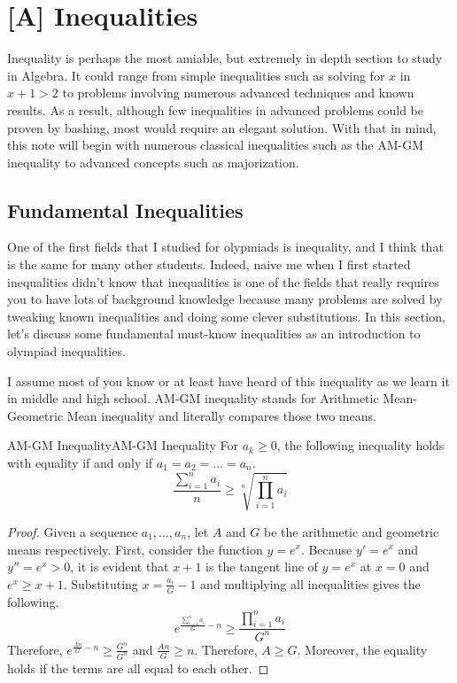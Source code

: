 \documentclass[../../../main.tex]{subfiles}
\begin{document}
\chapter{[A] Inequalities}

Inequality is perhaps the most amiable, but extremely in depth
section to study in Algebra. It could range from simple inequalities
such as solving for $x$ in $x + 1 > 2$ to problems involving
numerous advanced techniques and known results. As a result,
although few inequalities in advanced problems could be proven by
bashing, most would require an elegant solution. With that in mind,
this note will begin with numerous classical inequalities such as
the AM-GM inequality to advanced concepts such as majorization.

\section{Fundamental Inequalities}

One of the first fields that I studied for olypmiads is inequality,
and I think that is the same for many other students. Indeed,
naive me when I first started inequalities didn't know that
inequalities is one of the fields that really requires you to have
lots of background knowledge because many problems are solved
by tweaking known inequalities and doing some clever substitutions.
In this section, let's discuss some fundamental must-know inequalities
as an introduction to olympiad inequalities.

I assume most of you know or at least have heard of this inequality
as we learn it in middle and high school. AM-GM inequality stands
for Arithmetic Mean-Geometric Mean inequality and literally compares
those two means.

\begin{theorem}{AM-GM Inequality}{AM-GM Inequality}
For $a_k \geq 0$, the following inequality holds with equality if
and only if $a_1 = a_2 = \dots = a_n$.
\vspace{-0.8\baselineskip}
\[
\frac{ \sum_{i=1}^n a_i }{n} \geq
\sqrt[n]{ \prod_{i=1}^n a_i }
\]
\end{theorem}
\begin{proof}
Given a sequence $a_1, \ldots, a_n$, let $A$ and $G$ be the arithmetic
and geometric means respectively. First, consider the function
$y = e^x$. Because $y' = e^x$ and $y'' = e^x > 0$, it is evident that
$x + 1$ is the tangent line of $y = e^x$ at $x = 0$ and
$e^x \geq x + 1$. Substituting $x = \frac{a_i}{G} - 1$ and multiplying
all inequalities gives the following.
\[
e^{ \frac{\sum_{i=1}^n a_i}{G} - n }
\geq \frac{ \prod_{i=1}^n a_i }{G^n}
\]
Therefore, $e^{ \frac{An}{G} - n} \geq \frac{G^n}{G^n}$
and $\frac{An}{G} \geq n$. Therefore, $A \geq G$. Moreover,
the equality holds if the terms are all equal to each other.
\end{proof}
\end{document}
